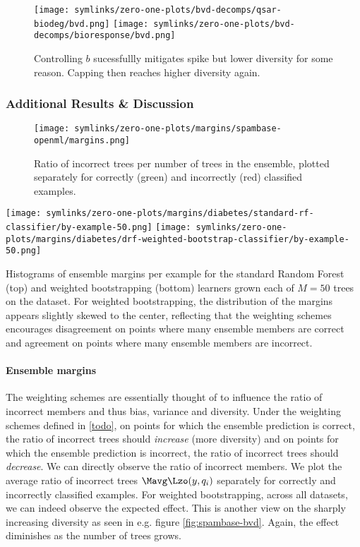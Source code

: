 \documentclass[../main.tex]{subfiles}
\begin{document}
\begin{figure*}
    \texttt{[image: symlinks/zero-one-plots/bvd-decomps/qsar-biodeg/bvd.png]}
    \texttt{[image: symlinks/zero-one-plots/bvd-decomps/bioresponse/bvd.png]}
    \caption{
        Controlling $b$ sucessfullly mitigates spike but lower diversity for some reason. Capping then reaches higher diversity again. 
    }
\end{figure*}

\subsubsection{Additional Results \& Discussion}


\begin{figure*}
    \texttt{[image: symlinks/zero-one-plots/margins/spambase-openml/margins.png]}
    \caption{
        Ratio of incorrect trees per number of trees in the ensemble, plotted separately for correctly (green) and incorrectly (red) classified examples. 
    }
    \label{fig:mnist-en}
\end{figure*}
\begin{marginfigure}
    \texttt{[image: symlinks/zero-one-plots/margins/diabetes/standard-rf-classifier/by-example-50.png]}
    \texttt{[image: symlinks/zero-one-plots/margins/diabetes/drf-weighted-bootstrap-classifier/by-example-50.png]}
    \caption{
        Histograms of ensemble margins per example for the standard Random Forest (top) and weighted bootstrapping (bottom) learners grown each of $M=50$ trees on the \diabetes dataset. For weighted bootstrapping, the distribution of the margins appears slightly skewed to the center, reflecting that the weighting schemes encourages disagreement on points where many ensemble members are correct and agreement on points where many ensemble members are incorrect.
    }
    \label{fig:cover-margins-50}
\end{marginfigure}
\paragraph{Ensemble margins} 
The weighting schemes are essentially thought of to influence the ratio of incorrect members and thus bias, variance and diversity. Under the weighting schemes defined in \ref{todo}, on points for which the ensemble prediction is correct, the ratio of incorrect trees should \textit{increase} (more diversity) and on points for which the ensemble prediction is incorrect, the ratio of incorrect trees should \textit{decrease}.
We can directly observe the ratio of incorrect members. We plot the average ratio of incorrect trees $\Mavg \Lzo(y, q_i)$ separately for correctly and incorrectly classified examples. For weighted bootstrapping, across all datasets, we can indeed observe the expected effect. This is another view on the sharply increasing diversity as seen in e.g. figure \ref{fig:spambase-bvd}. Again, the effect diminishes as the number of trees grows.
\end{document}
